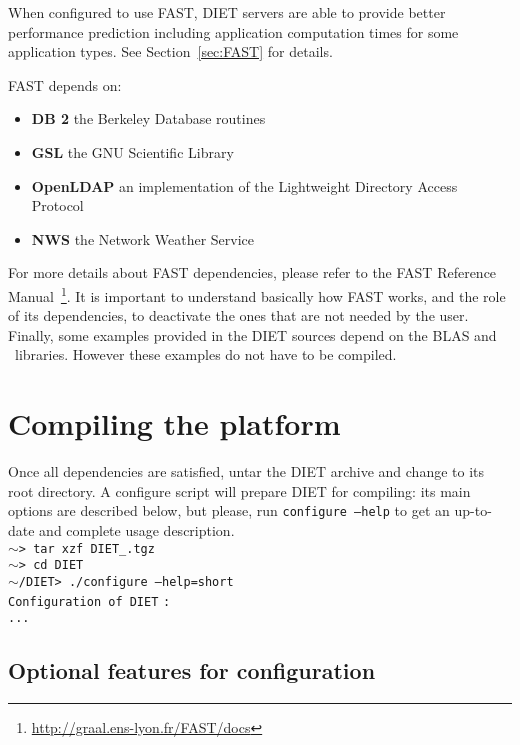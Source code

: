 When configured to use FAST, DIET servers are able to provide better
performance prediction including application computation times for
some application types.  See Section~\ref{sec:FAST} for details.

FAST depends on:
\begin{itemize}
 \item{\textbf{DB 2}} the Berkeley Database routines
 \item{\textbf{GSL}} the GNU Scientific Library
 \item{\textbf{OpenLDAP}} an implementation of the Lightweight
                          Directory Access Protocol
 \item{\textbf{NWS}} the Network Weather Service
\end{itemize}
For more details about FAST dependencies, please refer to the FAST
Reference Manual~\footnote{\url{http://graal.ens-lyon.fr/FAST/docs}}.
It is important to understand basically how FAST works, and the role
of its dependencies, to deactivate the ones that are not needed by the
user.\\

Finally, some examples provided in the DIET sources depend on the BLAS
and \scalapack\ libraries. However these examples do not have to be
compiled.


\section{Compiling the platform}
\label{sec:compil_platform}

Once all dependencies are satisfied, untar the DIET archive and change
to its root directory. A configure script will prepare DIET for
compiling: its main options are described below, but please, run
\texttt{configure --help} to get an up-to-date and complete usage
description.\\

\noindent
{\footnotesize
\texttt{$\sim$> tar xzf DIET\_}\dietversion\texttt{.tgz} \\
\texttt{$\sim$> cd DIET} \\
\texttt{$\sim$/DIET> ./configure --help=short} \\
\texttt{Configuration of DIET} \dietversion \texttt{:} \\
\texttt{...}
}

\subsection{Optional features for configuration}

